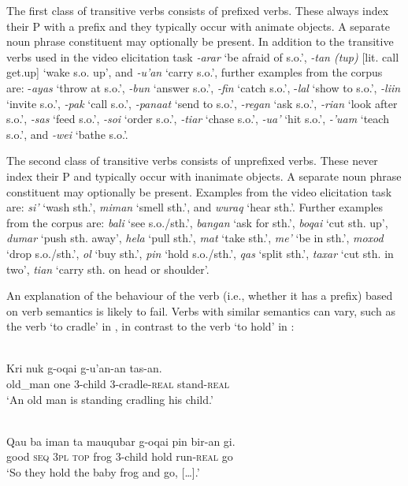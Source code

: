 The first class of transitive verbs consists of prefixed verbs. These always index their P with a prefix and they typically occur with animate objects. A separate noun phrase constituent may optionally be present. In addition to the transitive verbs used in the video elicitation task \textit{{}-arar} `be afraid of s.o.', \textit{{}-tan (tup)} [lit. call get.up] `wake s.o. up', and \textit{{}-u'an} `carry s.o.', further examples from the corpus are: -\textit{ayas} `throw at s.o.', \textit{{}-bun} `answer s.o.', \textit{{}-fin} `catch s.o.', -\textit{lal} `show to s.o.', \textit{{}-liin} `invite s.o.', \textit{{}-pak} `call s.o.', \textit{{}-panaat} `send to s.o.', \textit{{}-regan} `ask s.o.', \textit{{}-rian} `look after s.o.', \textit{{}-sas} `feed s.o.', \textit{{}-soi} `order s.o.', \textit{{}-tiar} `chase s.o.', \textit{{}-ua'} `hit s.o.', \textit{{}-'uam} `teach s.o.', and \textit{{}-wei} `bathe s.o.'. 

The second class of transitive verbs consists of unprefixed verbs. These never index their P and typically occur with inanimate objects. A separate noun phrase constituent may optionally be present. Examples from the video elicitation task are: \textit{si'} `wash sth.', \textit{miman} `smell sth.', and \textit{wuraq} `hear sth.'. Further examples from the corpus are: \textit{bali} `see s.o./sth.', \textit{bangan} `ask for sth.', \textit{boqai} `cut sth. up', \textit{dumar} `push sth. away', \textit{hela} `pull sth.', \textit{mat} `take sth.', \textit{me'} `be in sth.', \textit{moxod} `drop s.o./sth.', \textit{ol} `buy sth.', \textit{pin} `hold s.o./sth.', \textit{qas} `split sth.', \textit{taxar} `cut sth. in two', \textit{tian} `carry sth. on head or shoulder'.

An explanation of the behaviour of the verb (i.e., whether it has a prefix) based on verb semantics is likely to fail. Verbs with similar semantics can vary, such as the verb `to cradle' in , in contrast to the verb `to hold' in :


\ea 
\label{ex:10:1244}
 \\ 
 \gll    Kri  nuk  g-oqai  g-u'an-an  tas-an.\\
  old\_man  one  3-child  3-cradle-\textsc{real} stand-\textsc{real}  \\
 \glt `An old man is standing cradling his child.'
\z
 
\ea 
\label{ex:10:1245}
 \\ 
 \gll   Qau  ba  iman  ta    mauqubar  g-oqai  pin  bir-an  gi.\\
    good  \textsc{seq}  \textsc{3pl}  \textsc{top}  frog  3-child  hold  run-\textsc{real}  go \\
 \glt  `So they hold the baby frog and go, [{\dots}].' 
\z

